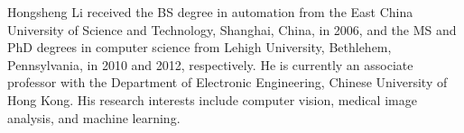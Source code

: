 \begin{IEEEbiography}{Hongsheng Li}
received the BS degree in automation from the East China University of Science and Technology, Shanghai, China, in 2006, and the MS and PhD degrees in computer science from Lehigh University, Bethlehem, Pennsylvania, in 2010 and 2012, respectively. He is currently an associate professor with the Department of Electronic Engineering, Chinese University of Hong Kong. His research interests include computer vision, medical image analysis, and machine learning.
\end{IEEEbiography}

